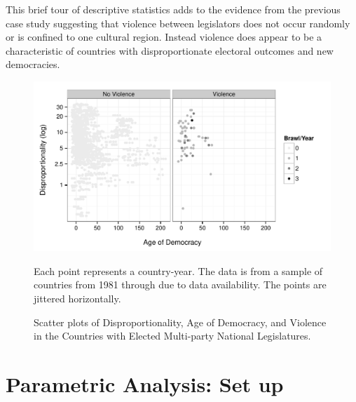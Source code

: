 \documentclass[a4paper]{article}\usepackage[]{graphicx}\usepackage[]{color}
\newenvironment{knitrout}{}{} %
\begin{document}
This brief tour of descriptive statistics adds to the evidence from the previous case study suggesting that violence between legislators does not occur randomly or is confined to one cultural region. Instead violence does appear to be a characteristic of countries with disproportionate electoral outcomes and new democracies.

\begin{figure}[t]
    \begin{center}

\begin{knitrout}
\color{fgcolor}
\includegraphics[width=0.8\linewidth]{figure/FrameworkEmpirical-1} 

\end{knitrout}
    \end{center}

    \caption{Scatter plots of Disproportionality, Age of Democracy, and Violence in the Countries with Elected Multi-party National Legislatures.}
    \label{framework_empirical}

    \begin{singlespace}
        {\scriptsize{Each point represents a country-year. The data is from a sample of countries from 1981 through  due to data availability. The points are jittered horizontally.}}
    \end{singlespace}

\end{figure}



\section{Parametric Analysis: Set up}
\end{document}
